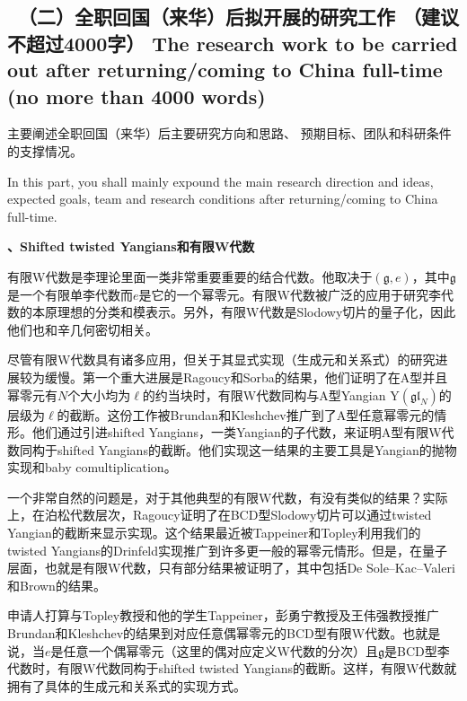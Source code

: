 \documentclass[12pt,UTF8,AutoFakeBold=4,a4paper]{ctexart}
\begin{document}
{\color{MsBlue} \subsection{\sihao \kaishu \qquad \ 
\textbf{（二）全职回国（来华）后拟开展的研究工作} {\normalfont（建议不超过4000字）} 
\bfseries \xiaosihao {} 
The research work to 
be carried out after returning/coming to China full-time (no more than 4000 words)} 
}

 

{\sihao \color{MsBlue} \kaishu 主要阐述全职回国（来华）后主要研究方向和思路、
预期目标、团队和科研条件的支撑情况。}

\medskip

{\color{MsBlue}  
In this part, you shall mainly expound the main research direction and ideas, 
expected goals, team and research conditions after returning/coming to China 
full-time.}

\medskip

\textbf{、Shifted twisted Yangians和有限W代数}

有限W代数是李理论里面一类非常重要重要的结合代数。他取决于$(\mathfrak g,e)$，其中$\mathfrak g$是一个有限单李代数而$e$是它的一个幂零元。有限W代数被广泛的应用于研究李代数的本原理想的分类和模表示。另外，有限W代数是Slodowy切片的量子化，因此他们也和辛几何密切相关。

尽管有限W代数具有诸多应用，但关于其显式实现（生成元和关系式）的研究进展较为缓慢。第一个重大进展是Ragoucy和Sorba的结果，他们证明了在A型并且幂零元有$N$个大小均为$\ell$的约当块时，有限W代数同构与A型Yangian $\mathrm{Y}(\mathfrak{gl}_N)$的层级为$\ell$的截断。这份工作被Brundan和Kleshchev推广到了A型任意幂零元的情形。他们通过引进shifted Yangians，一类Yangian的子代数，来证明A型有限W代数同构于shifted Yangians的截断。他们实现这一结果的主要工具是Yangian的抛物实现和baby comultiplication。

一个非常自然的问题是，对于其他典型的有限W代数，有没有类似的结果？实际上，在泊松代数层次，Ragoucy证明了在BCD型Slodowy切片可以通过twisted Yangian的截断来显示实现。这个结果最近被Tappeiner和Topley利用我们的twisted Yangians的Drinfeld实现推广到许多更一般的幂零元情形。但是，在量子层面，也就是有限W代数，只有部分结果被证明了，其中包括De Sole–Kac–Valeri和Brown的结果。

申请人打算与Topley教授和他的学生Tappeiner，彭勇宁教授及王伟强教授推广Brundan和Kleshchev的结果到对应任意偶幂零元的BCD型有限W代数。也就是说，当$e$是任意一个偶幂零元（这里的偶对应定义W代数的分次）且$\mathfrak g$是BCD型李代数时，有限W代数同构于shifted twisted Yangians的截断。这样，有限W代数就拥有了具体的生成元和关系式的实现方式。
\end{document}
